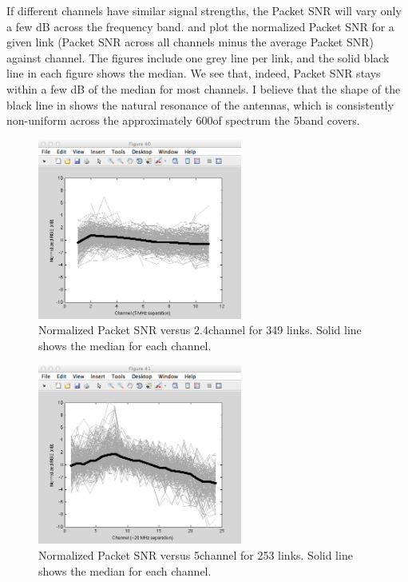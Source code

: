 If different channels have similar signal strengths, the Packet SNR will vary only a few dB across the frequency band.  and  plot the normalized Packet SNR for a given link (Packet SNR across all channels minus the average Packet SNR) against channel. The figures include one grey line per link, and the solid black line in each figure shows the median. We see that, indeed, Packet SNR stays within a few dB of the median for most channels. I believe that the shape of the black line in  shows the natural resonance of the antennas, which is consistently non-uniform across the approximately 600\MHz of spectrum the 5\GHz band covers.

\begin{figure}[htp]
	\centering
	\includegraphics[width=0.6\textwidth]{figures/esnr/rssi_vs_freq_24.png}
	\caption[Normalized Packet SNR versus 2.4\GHz channel for 349 links]{\label{fig:rssi_vs_freq_24}Normalized Packet SNR versus 2.4\GHz channel for 349 links. Solid line shows the median for each channel.}
\end{figure}
\begin{figure}[htp]
	\centering
	\includegraphics[width=0.6\textwidth]{figures/esnr/rssi_vs_freq_5.png}
	\caption[Normalized Packet SNR versus 5\GHz channel for 253 links]{\label{fig:rssi_vs_freq_5}Normalized Packet SNR versus 5\GHz channel for 253 links. Solid line shows the median for each channel.}
\end{figure}

